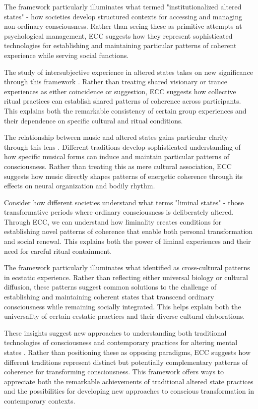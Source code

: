\begin{refsection}
The framework particularly illuminates what \cite{bourguignon1976possession} termed "institutionalized altered states" - how societies develop structured contexts for accessing and managing non-ordinary consciousness. Rather than seeing these as primitive attempts at psychological management, ECC suggests how they represent sophisticated technologies for establishing and maintaining particular patterns of coherent experience while serving social functions.

The study of intersubjective experience in altered states takes on new significance through this framework \cite{rouget1985music}. Rather than treating shared visionary or trance experiences as either coincidence or suggestion, ECC suggests how collective ritual practices can establish shared patterns of coherence across participants. This explains both the remarkable consistency of certain group experiences and their dependence on specific cultural and ritual conditions.

The relationship between music and altered states gains particular clarity through this lens \cite{rouget1985music}. Different traditions develop sophisticated understanding of how specific musical forms can induce and maintain particular patterns of consciousness. Rather than treating this as mere cultural association, ECC suggests how music directly shapes patterns of energetic coherence through its effects on neural organization and bodily rhythm.

Consider how different societies understand what \cite{turner1969ritual} terms "liminal states" - those transformative periods where ordinary consciousness is deliberately altered. Through ECC, we can understand how liminality creates conditions for establishing novel patterns of coherence that enable both personal transformation and social renewal. This explains both the power of liminal experiences and their need for careful ritual containment.

The framework particularly illuminates what \cite{goodman1988ecstasy} identified as cross-cultural patterns in ecstatic experience. Rather than reflecting either universal biology or cultural diffusion, these patterns suggest common solutions to the challenge of establishing and maintaining coherent states that transcend ordinary consciousness while remaining socially integrated. This helps explain both the universality of certain ecstatic practices and their diverse cultural elaborations.

These insights suggest new approaches to understanding both traditional technologies of consciousness and contemporary practices for altering mental states \cite{winkelman2010shamanism}. Rather than positioning these as opposing paradigms, ECC suggests how different traditions represent distinct but potentially complementary patterns of coherence for transforming consciousness. This framework offers ways to appreciate both the remarkable achievements of traditional altered state practices and the possibilities for developing new approaches to conscious transformation in contemporary contexts.


\end{refsection}
